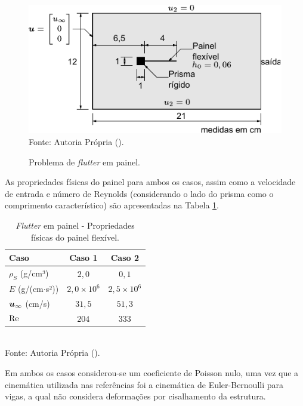 \begin{figure}[h!]
    \centering
    \caption{Problema de \textit{flutter} em painel.}
    \includegraphics[width=.75\linewidth]{Figuras/FSI-prism/FSI-prism.pdf}
    \\Fonte: Autoria Própria (\the\year).
    \label{fig:FSI-prism}
\end{figure}

As propriedades físicas do painel para ambos os casos, assim como a velocidade de entrada e número de Reynolds (considerando o lado do prisma como o comprimento característico) são apresentadas na Tabela \ref{tab:panelProp}.

\begin{table}[h!]
    \centering
    \caption{\textit{Flutter} em painel - Propriedades físicas do painel flexível.}
    \begin{tabular}{lcc}
        \hline
        Caso                   & Caso 1            & Caso 2            \\ \hline
        $\rho_S$ (g/cm³)       & $2,0$             & $0,1$             \\
        $E$ (g/(cm$\cdot$s²))  & $2,0\times10^{6}$ & $2,5\times10^{6}$ \\
        $\boldsymbol{u}_\infty$ (cm/s) & $31,5$            & $51,3$            \\
        $\mathrm{Re}$                 & $204$             & $333$             \\\hline
    \end{tabular}
    \\Fonte: Autoria Própria (\the\year).
    \label{tab:panelProp}
\end{table}

Em ambos os casos considerou-se um coeficiente de Poisson nulo, uma vez que a cinemática utilizada nas referências foi a cinemática de Euler-Bernoulli para vigas, a qual não considera deformações por cisalhamento da estrutura.

